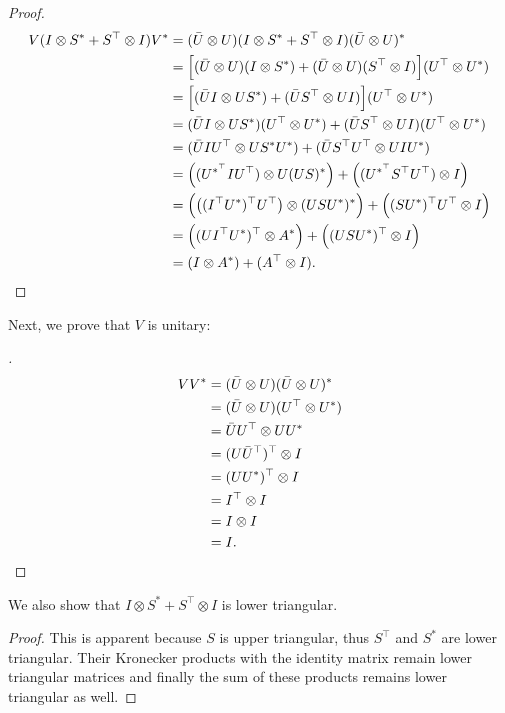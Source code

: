 \documentclass[11pt]{article}
\newcommand{\kp}{\otimes}
\begin{document}
\begin{proof}
\begin{align*}
   V (I \kp S^{*} + S^\top \kp I) V^{*}
   &= (\bar{U} \kp U) (I \kp S^{*} + S^\top \kp I) (\bar{U} \kp U)^{*} \\
   &= \Big[(\bar{U} \kp U) (I \kp S^{*}) + (\bar{U} \kp U) (S^\top \kp I)\Big] (U^\top \kp U^{*}) \\
   &= \Big[(\bar{U} I \kp U S^{*}) + (\bar{U}S^\top \kp U I)\Big] (U^\top \kp U^{*}) \\
   &= (\bar{U} I \kp U S^{*}) (U^\top \kp U^{*}) + (\bar{U}S^\top \kp U I) (U^\top \kp U^{*}) \\
   &= (\bar{U} I U^\top \kp U S^{*} U^{*}) + (\bar{U}S^\top U^\top \kp U I U^{*}) \\
   &= \Big((U^{*^\top} I U^\top)\kp U (U S)^{*} \Big) + \Big((U^{*^\top} S^\top U^\top) \kp I \Big) \\
   &= \Big(\big((I^\top U^{*})^\top U^\top\big) \kp (U S U^{*})^{*} \Big) + \Big((S U^{*})^\top U^\top \kp I \Big) \\
   &= \Big((U I^\top U^{*})^\top \kp A^{*} \Big) + \Big((U S U^{*})^\top \kp I \Big)\\
   &= (I \kp A^{*} ) + (A^\top \kp I).\qedhere
\end{align*}
\end{proof}

Next, we prove that \(V\) is unitary:
\begin{proof}[\leavevmode]
\begin{align*}
   V V^{*} &= (\bar{U} \kp U) (\bar{U} \kp U)^{*} \\
   &= (\bar{U} \kp U) (U^\top \kp U^{*}) \\
   &= \bar{U} U^\top \kp U U^{*} \\
   &= (U \bar{U}^\top)^\top \kp I \\
   &= (U U^{*})^\top \kp I \\
   &= I^\top \kp I \\
   &= I \kp I \\
   &= I.\qedhere
\end{align*}
\end{proof}

We also show that $I \kp S^{*} + S^\top \kp I$ is lower triangular.
\begin{proof}
	This is apparent because \(S\) is upper triangular, thus $S^\top$ and $S^{*}$ are lower triangular.
	Their Kronecker products with the identity matrix remain lower triangular matrices and finally the sum of these products remains lower triangular as well.
\end{proof}
\end{document}
